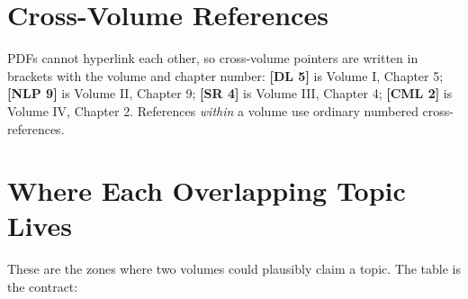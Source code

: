 \section*{Cross-Volume References}

PDFs cannot hyperlink each other, so cross-volume pointers are written in brackets with the volume and chapter number: \textbf{[DL 5]} is Volume I, Chapter 5; \textbf{[NLP 9]} is Volume II, Chapter 9; \textbf{[SR 4]} is Volume III, Chapter 4; \textbf{[CML 2]} is Volume IV, Chapter 2. References \emph{within} a volume use ordinary numbered cross-references.

\section*{Where Each Overlapping Topic Lives}

These are the zones where two volumes could plausibly claim a topic. The table is the contract:

